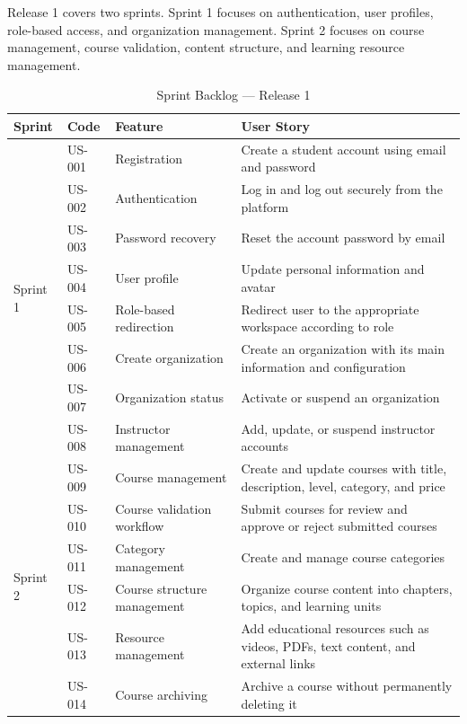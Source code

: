 Release 1 covers two sprints. Sprint 1 focuses on authentication, user profiles,
role-based access, and organization management. Sprint 2 focuses on course management,
course validation, content structure, and learning resource management.
\begin{table}[H]
\centering
\caption{Sprint Backlog — Release 1}
\label{tab:backlog_r1}
\footnotesize
\renewcommand{\arraystretch}{1.3}   %

\begin{tabularx}{\textwidth}{|p{1.8cm}|p{1.3cm}|p{2.8cm}|X|}
\hline
\textbf{Sprint} & \textbf{Code} & \textbf{Feature} & \textbf{User Story} \\
\hline
\multirow{8}{*}{Sprint 1}
  & US-001 & Registration & Create a student account using email and password \\
  \cline{2-4}
  & US-002 & Authentication & Log in and log out securely from the platform \\
  \cline{2-4}
  & US-003 & Password recovery & Reset the account password by email \\
  \cline{2-4}
  & US-004 & User profile & Update personal information and avatar \\
  \cline{2-4}
  & US-005 & Role-based redirection & Redirect user to the appropriate workspace according to role \\
  \cline{2-4}
  & US-006 & Create organization & Create an organization with its main information and configuration \\
  \cline{2-4}
  & US-007 & Organization status & Activate or suspend an organization \\
  \cline{2-4}
  & US-008 & Instructor management & Add, update, or suspend instructor accounts \\
\hline
\multirow{6}{*}{Sprint 2}
  & US-009 & Course management & Create and update courses with title, description, level, category, and price \\
  \cline{2-4}
  & US-010 & Course validation workflow & Submit courses for review and approve or reject submitted courses \\
  \cline{2-4}
  & US-011 & Category management & Create and manage course categories \\
  \cline{2-4}
  & US-012 & Course structure management & Organize course content into chapters, topics, and learning units \\
  \cline{2-4}
  & US-013 & Resource management & Add educational resources such as videos, PDFs, text content, and external links \\
  \cline{2-4}
  & US-014 & Course archiving & Archive a course without permanently deleting it \\
\hline
\end{tabularx}
\end{table}
